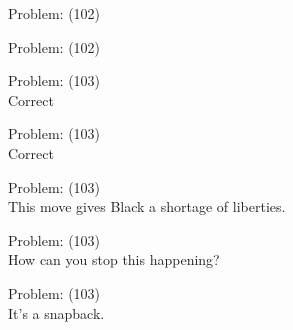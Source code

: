 \documentclass[11pt]{article}
\begin{document}
\begin{minipage}[t]{0.5\textwidth}
  {\centering
  
  Problem: (102)\\
  
  }
\end{minipage}
\begin{minipage}[t]{0.5\textwidth}
  {\centering
  
  Problem: (102)\\
  
  }
\end{minipage}
\begin{minipage}[t]{0.5\textwidth}
  {\centering
  
  Problem: (103)\\
  Correct\\
  }
\end{minipage}
\begin{minipage}[t]{0.5\textwidth}
  {\centering
  
  Problem: (103)\\
  Correct\\
  }
\end{minipage}
\begin{minipage}[t]{0.5\textwidth}
  {\centering
  
  Problem: (103)\\
  This move gives Black a shortage of liberties.\\
  }
\end{minipage}
\begin{minipage}[t]{0.5\textwidth}
  {\centering
  
  Problem: (103)\\
  How can you stop this happening?\\
  }
\end{minipage}
\begin{minipage}[t]{0.5\textwidth}
  {\centering
  
  Problem: (103)\\
  It's a snapback.\\
  }
\end{minipage}
\end{document}
